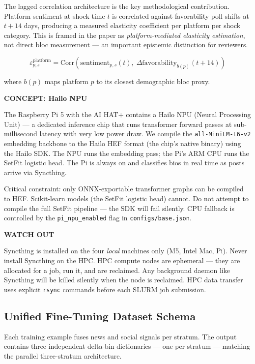 \documentclass[11pt]{article}
\newcommand{\concept}[2]{%
  \begin{mdframed}[style=conceptbox]
  {\small\bfseries\color{bluefg}CONCEPT: #1}\par\smallskip #2
  \end{mdframed}}
\newcommand{\warnbox}[1]{%
  \begin{mdframed}[style=warnbox]
  {\small\bfseries\color{amberfg}WATCH OUT}\par\smallskip #1
  \end{mdframed}}
\begin{document}
\medskip
The lagged correlation architecture is the key methodological contribution. Platform
sentiment at shock time $t$ is correlated against favorability poll shifts at $t + 14$
days, producing a measured elasticity coefficient per platform per shock category.
This is framed in the paper as \textit{platform-mediated elasticity estimation}, not
direct bloc measurement --- an important epistemic distinction for reviewers.

\[
  \varepsilon^{\mathrm{platform}}_{p,s}
  = \mathrm{Corr}\!\left(
      \mathrm{sentiment}_{p,s}(t),\;
      \Delta\mathrm{favorability}_{b(p)}(t + 14)
    \right)
\]

where $b(p)$ maps platform $p$ to its closest demographic bloc proxy.

\concept{Hailo NPU}{
The Raspberry Pi 5 with the AI HAT+ contains a Hailo NPU (Neural Processing Unit)
--- a dedicated inference chip that runs transformer forward passes at sub-millisecond
latency with very low power draw. We compile the \texttt{all-MiniLM-L6-v2} embedding
backbone to the Hailo HEF format (the chip's native binary) using the Hailo SDK.
The NPU runs the embedding pass; the Pi's ARM CPU runs the SetFit logistic head.
The Pi is always on and classifies bios in real time as posts arrive via Syncthing.

Critical constraint: only ONNX-exportable transformer graphs can be compiled to
HEF. Scikit-learn models (the SetFit logistic head) cannot. Do not attempt to
compile the full SetFit pipeline --- the SDK will fail silently. CPU fallback is
controlled by the \texttt{pi\_npu\_enabled} flag in \texttt{configs/base.json}.
}

\warnbox{
Syncthing is installed on the four \emph{local} machines only (M5, Intel Mac,
Pi). Never install Syncthing on the HPC. HPC compute nodes are
ephemeral --- they are allocated for a job, run it, and are reclaimed. Any background
daemon like Syncthing will be killed silently when the node is reclaimed. HPC data
transfer uses explicit \texttt{rsync} commands before each SLURM job submission.
}

\subsection*{Unified Fine-Tuning Dataset Schema}

Each training example fuses news and social signals per stratum. The output
contains three independent delta-bin dictionaries --- one per stratum --- matching
the parallel three-stratum architecture.
\end{document}

